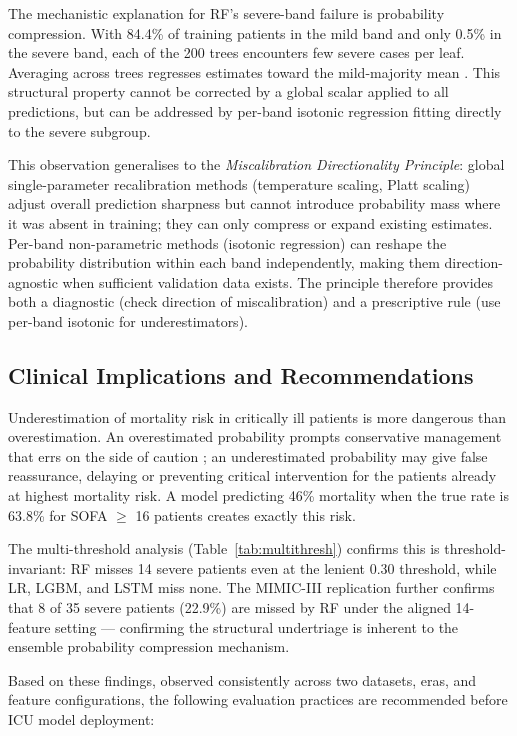 \documentclass{ieeeaccess}
\begin{document}
The mechanistic explanation for RF's severe-band failure is probability compression. With 84.4\% of training patients in the mild band and only 0.5\% in the severe band, each of the 200 trees encounters few severe cases per leaf. Averaging across trees regresses estimates toward the mild-majority mean \cite{b27}. This structural property cannot be corrected by a global scalar applied to all predictions, but can be addressed by per-band isotonic regression fitting directly to the severe subgroup.

This observation generalises to the \textit{Miscalibration Directionality Principle}: global single-parameter recalibration methods (temperature scaling, Platt scaling) adjust overall prediction sharpness but cannot introduce probability mass where it was absent in training; they can only compress or expand existing estimates. Per-band non-parametric methods (isotonic regression) can reshape the probability distribution within each band independently, making them direction-agnostic when sufficient validation data exists. The principle therefore provides both a diagnostic (check direction of miscalibration) and a prescriptive rule (use per-band isotonic for underestimators).

\subsection{Clinical Implications and Recommendations}

Underestimation of mortality risk in critically ill patients is more dangerous than overestimation. An overestimated probability prompts conservative management that errs on the side of caution \cite{b5}; an underestimated probability may give false reassurance, delaying or preventing critical intervention for the patients already at highest mortality risk. A model predicting 46\% mortality when the true rate is 63.8\% for SOFA $\ge$ 16 patients creates exactly this risk.

The multi-threshold analysis (Table~\ref{tab:multithresh}) confirms this is threshold-invariant: RF misses 14 severe patients even at the lenient 0.30 threshold, while LR, LGBM, and LSTM miss none. The MIMIC-III replication further confirms that 8 of 35 severe patients (22.9\%) are missed by RF under the aligned 14-feature setting — confirming the structural undertriage is inherent to the ensemble probability compression mechanism.

Based on these findings, observed consistently across two datasets, eras, and feature configurations, the following evaluation practices are recommended before ICU model deployment:
\end{document}
